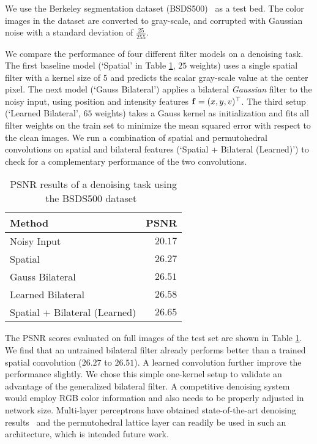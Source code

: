 We use the Berkeley segmentation dataset
(BSDS500)~\cite{arbelaezi2011bsds500} as a test bed. The color
images in the dataset are converted to gray-scale,
and corrupted with Gaussian noise with a standard deviation of
$\frac {25} {255}$.

We compare the performance of four different filter models on a
denoising task.
The first baseline model (`Spatial' in Table \ref{tab:denoising}, $25$
weights) uses a single spatial filter with a kernel size of
$5$ and predicts the scalar gray-scale value at the center pixel. The next model
(`Gauss Bilateral') applies a bilateral \emph{Gaussian}
filter to the noisy input, using position and intensity features $\mathbf{f}=(x,y,v)^\top$.
The third setup (`Learned Bilateral', $65$ weights)
takes a Gauss kernel as initialization and
fits all filter weights on the train set to minimize the
mean squared error with respect to the clean images.
We run a combination
of spatial and permutohedral convolutions on spatial and bilateral
features (`Spatial + Bilateral (Learned)') to check for a complementary
performance of the two convolutions.

\label{sec:exp:denoising}
\begin{table}[!h]
\begin{center}
  \footnotesize
  \begin{tabular}[t]{lr}
    \toprule
    Method & PSNR \\
    \midrule
    Noisy Input & $20.17$ \\
    Spatial & $26.27$ \\
    Gauss Bilateral & $26.51$ \\
    Learned Bilateral & $26.58$ \\
    Spatial + Bilateral (Learned) & \textbf{$26.65$} \\
    \bottomrule
  \end{tabular}
\end{center}
\vspace{-0.5em}
\caption{PSNR results of a denoising task using the BSDS500
  dataset~\cite{arbelaezi2011bsds500}}
\vspace{-0.5em}
\label{tab:denoising}
\end{table}
\vspace{-0.2em}

The PSNR scores evaluated on full images of the test set are
shown in Table \ref{tab:denoising}. We find that an untrained bilateral
filter already performs better than a trained spatial convolution
($26.27$ to $26.51$). A learned convolution further improve the
performance slightly. We chose this simple one-kernel setup to
validate an advantage of the generalized bilateral filter. A competitive
denoising system would employ RGB color information and also
needs to be properly adjusted in network size. Multi-layer perceptrons
have obtained state-of-the-art denoising results~\cite{burger12cvpr}
and the permutohedral lattice layer can readily be used in such an
architecture, which is intended future work.


